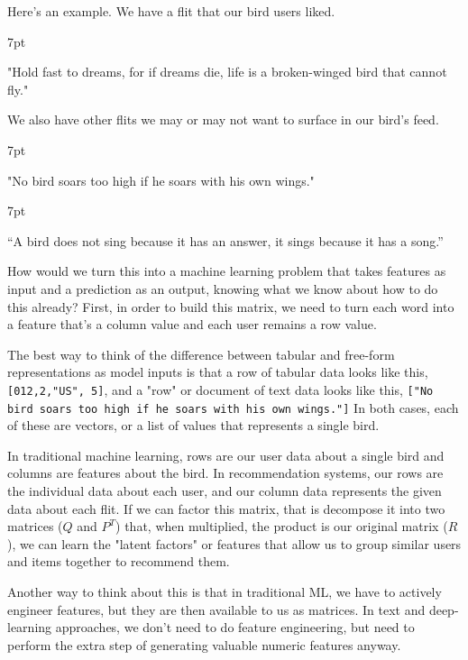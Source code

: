 \documentclass[11pt, table]{diazessay} %
\newenvironment{formal}{%
  \def\FrameCommand{%
	\hspace{1pt}%
	{\color{w_lightblue}\vrule width 2pt}%
	{\color{formalshade}\vrule width 4pt}%
	\colorbox{formalshade}%
  }%
  \MakeFramed{\advance\hsize-\width\FrameRestore}%
  \noindent\hspace{-4.55pt}%
  \begin{adjustwidth}{}{7pt}%
  \vspace{2pt}\vspace{2pt}%
}
{%
  \vspace{2pt}\end{adjustwidth}\endMakeFramed%
}
\begin{document}
\begin{sloppypar}
Here’s an example.  We have a flit that our bird users liked.

\begin{formal}
    "Hold fast to dreams, for if dreams die, life is a broken-winged bird that cannot fly."
\end{formal}

We also have other flits we may or may not want to surface in our bird's feed.

\begin{formal}
"No bird soars too high if he soars with his own wings."
\end{formal}

\begin{formal}
“A bird does not sing because it has an answer, it sings because it has a song.”
\end{formal}

How would we turn this into a machine learning problem that takes features as input and a prediction as an output, knowing what we know about how to do this already?  First, in order to build this matrix, we need to turn each word into a feature that's a column value and each user remains a row value.

\begin{flushleft}
The best way to think of the difference between tabular and free-form representations as model inputs is that a row of tabular data looks like this,\texttt{ [012,2,"US", 5]}, and a "row" or document of text data looks like this, \texttt{["No bird soars too high if he soars with his own wings."]} In both cases, each of these are vectors, or a list of values that represents a single bird.
\end{flushleft}

In traditional machine learning, rows are our user data about a single bird and columns are features about the bird. In recommendation systems, our rows are the individual data about each user, and our column data represents the given data about each flit.  If we can factor this matrix, that is decompose it into two matrices ($Q$ and $P^T$) that, when multiplied, the product is our original matrix ($R$), we can learn the "latent factors" or features that allow us to group similar users and items together to recommend them.

Another way to think about this is that in traditional ML, we have to actively engineer features, but they are then available to us as matrices. In text and deep-learning approaches, we don't need to do feature engineering, but need to perform the extra step of generating valuable numeric features anyway.



\end{sloppypar}
\end{document}
